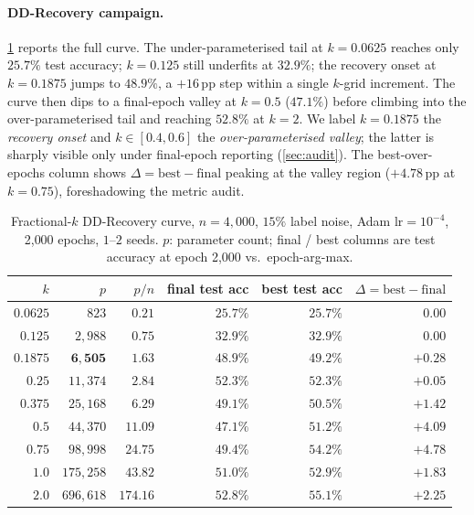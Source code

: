\paragraph{DD-Recovery campaign.} \cref{tab:dd-recovery} reports the full curve. The under-parameterised tail at $k\!=\!0.0625$ reaches only $25.7\%$ test accuracy; $k\!=\!0.125$ still underfits at $32.9\%$; the recovery onset at $k\!=\!0.1875$ jumps to $48.9\%$, a $+16$\,pp step within a single $k$-grid increment. The curve then dips to a final-epoch valley at $k\!=\!0.5$ ($47.1\%$) before climbing into the over-parameterised tail and reaching $52.8\%$ at $k\!=\!2$. We label $k\!=\!0.1875$ the \emph{recovery onset} and $k\!\in\![0.4,0.6]$ the \emph{over-parameterised valley}; the latter is sharply visible only under final-epoch reporting (\cref{sec:audit}). The best-over-epochs column shows $\Delta\!=\!\mathrm{best}\!-\!\mathrm{final}$ peaking at the valley region ($+4.78$\,pp at $k\!=\!0.75$), foreshadowing the metric audit.

\begin{table}[t]
  \centering
  \small
  \caption{Fractional-$k$ DD-Recovery curve, $n\!=\!4{,}000$, $15\%$ label noise, Adam $\mathrm{lr}\!=\!10^{-4}$, 2{,}000 epochs, $1$--$2$ seeds. $p$: parameter count; final / best columns are test accuracy at epoch 2{,}000 vs.\ epoch-arg-max.}
  \label{tab:dd-recovery}
  \begin{tabular}{@{}rrrrrr@{}}
    \toprule
    $k$ & $p$ & $p/n$ & final test acc & best test acc & $\Delta = \mathrm{best}-\mathrm{final}$ \\
    \midrule
    $0.0625$ & $823$    & $0.21$  & $25.7\%$ & $25.7\%$ & $\phantom{+}0.00$ \\
    $0.125$  & $2{,}988$ & $0.75$ & $32.9\%$ & $32.9\%$ & $\phantom{+}0.00$ \\
    \textbf{$0.1875$} & $\mathbf{6{,}505}$ & $\mathbf{1.63}$ & $\mathbf{48.9\%}$ & $\mathbf{49.2\%}$ & $+0.28$ \\
    $0.25$   & $11{,}374$ & $2.84$  & $52.3\%$ & $52.3\%$ & $+0.05$ \\
    $0.375$  & $25{,}168$ & $6.29$  & $49.1\%$ & $50.5\%$ & $+1.42$ \\
    $0.5$    & $44{,}370$ & $11.09$ & $47.1\%$ & $51.2\%$ & $+4.09$ \\
    $0.75$   & $98{,}998$ & $24.75$ & $49.4\%$ & $54.2\%$ & $+4.78$ \\
    $1.0$    & $175{,}258$ & $43.82$ & $51.0\%$ & $52.9\%$ & $+1.83$ \\
    $2.0$    & $696{,}618$ & $174.16$ & $52.8\%$ & $55.1\%$ & $+2.25$ \\
    \bottomrule
  \end{tabular}
\end{table}

